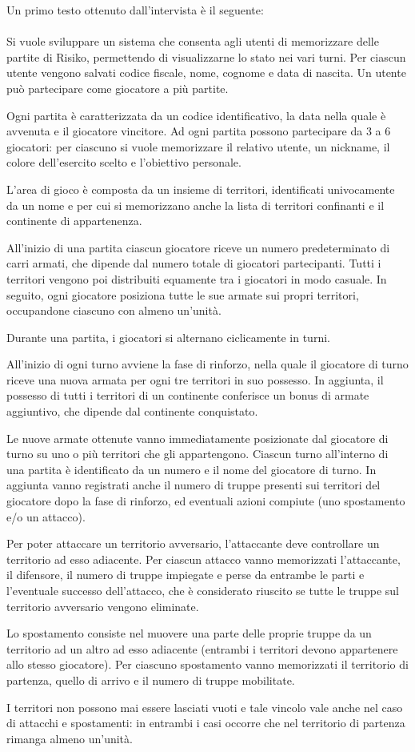 \documentclass[a4paper,12pt]{report}
\begin{document}
Un primo testo ottenuto dall’intervista è il seguente: \\ \\
Si vuole sviluppare un sistema che consenta agli utenti di memorizzare delle partite di Risiko, permettendo di visualizzarne lo stato nei vari turni. Per ciascun utente vengono salvati codice fiscale, nome, cognome e data di nascita. Un utente può partecipare come giocatore a più partite. \par
Ogni partita è caratterizzata da un codice identificativo, la data nella quale è avvenuta e il giocatore vincitore.
Ad ogni partita possono partecipare da 3 a 6 giocatori: per ciascuno si vuole memorizzare il relativo utente, un nickname, il colore dell’esercito scelto e l’obiettivo personale. \par
L’area di gioco è composta da un insieme di territori, identificati univocamente da un nome e per cui si memorizzano anche la lista di territori confinanti e il continente di appartenenza. \par
All’inizio di una partita ciascun giocatore riceve un numero predeterminato di carri armati, che dipende dal numero totale di giocatori partecipanti. Tutti i territori vengono poi distribuiti equamente tra i giocatori in modo casuale. In seguito, ogni giocatore posiziona tutte le sue armate sui propri territori, occupandone ciascuno con almeno un’unità. \par
Durante una partita, i giocatori si alternano ciclicamente in turni. \par
All’inizio di ogni turno avviene la fase di rinforzo, nella quale il giocatore di turno riceve una nuova armata per ogni tre territori in suo possesso. In aggiunta, il possesso di tutti i territori di un continente conferisce un bonus di armate aggiuntivo, che dipende dal continente conquistato. \par 
Le nuove armate ottenute vanno immediatamente posizionate dal giocatore di turno su uno o più territori che gli appartengono.
Ciascun turno all’interno di una partita è identificato da un numero e il nome del giocatore di turno. In aggiunta vanno registrati anche il numero di truppe presenti sui territori del giocatore dopo la fase di rinforzo, ed eventuali azioni compiute (uno spostamento e/o un attacco). \par
Per poter attaccare un territorio avversario, l’attaccante deve controllare un territorio ad esso adiacente. Per ciascun attacco vanno memorizzati l’attaccante, il difensore, il numero di truppe impiegate e perse da entrambe le parti e l’eventuale successo dell’attacco, che è considerato riuscito se tutte le truppe sul territorio avversario vengono eliminate. \par
Lo spostamento consiste nel muovere una parte delle proprie truppe da un territorio ad un altro ad esso adiacente (entrambi i territori devono appartenere allo stesso giocatore). Per ciascuno spostamento vanno memorizzati il territorio di partenza, quello di arrivo e il numero di truppe mobilitate. \par
I territori non possono mai essere lasciati vuoti e tale vincolo vale anche nel caso di attacchi e spostamenti: in entrambi i casi occorre che nel territorio di partenza rimanga almeno un’unità.
\end{document}

